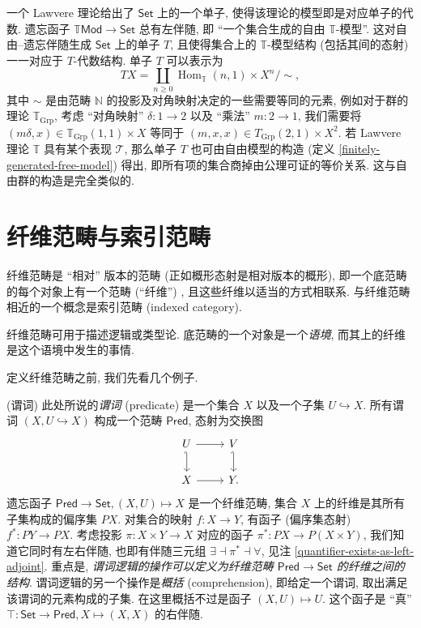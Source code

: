 一个 Lawvere 理论给出了 $\mathsf {Set}$ 上的一个单子, 使得该理论的模型即是对应单子的代数.
遗忘函子 $\mathbb T\mathsf {Mod}\to\mathsf {Set}$ 总有左伴随, 即 ``一个集合生成的自由 $\mathbb T$-模型''. 这对自由--遗忘伴随生成 $\mathsf {Set}$ 上的单子 $T$, 且使得集合上的 $\mathbb T$-模型结构 (包括其间的态射) 一一对应于 $T$-代数结构.
单子 $T$ 可以表示为
\[
	TX = \coprod_{n\geq 0} \operatorname{Hom}_{\mathbb T}(n,1)\times X^n\Bigg/ \sim,
\]
其中 $\sim$ 是由范畴 $\mathbb{N}$ 的投影及对角映射决定的一些需要等同的元素, 例如对于群的理论 $\mathbb T_{\text{Grp}}$,
考虑 ``对角映射'' $\delta\colon 1\to 2$ 以及 ``乘法'' $m\colon 2\to 1$, 我们需要将 $(m\delta,x)\in \mathbb T_{\text{Grp}}(1,1)\times X$ 等同于 $(m,x,x)\in T_{\text{Grp}}(2,1)\times X^2$.
若 Lawvere 理论 $\mathbb T$ 具有某个表现 $\mathcal T$,
那么单子 $T$ 也可由自由模型的构造 (定义 \ref{finitely-generated-free-model}) 得出, 即所有项的集合商掉由公理可证的等价关系. 这与自由群的构造是完全类似的.

\section{纤维范畴与索引范畴}

纤维范畴是 ``相对'' 版本的范畴 (正如概形态射是相对版本的概形), 即一个底范畴的每个对象上有一个范畴 (``纤维'') , 且这些纤维以适当的方式相联系.
与纤维范畴相近的一个概念是索引范畴 (indexed category).

纤维范畴可用于描述逻辑或类型论. 底范畴的一个对象是一个\emph{语境}, 而其上的纤维是这个语境中发生的事情.

定义纤维范畴之前, 我们先看几个例子.

\begin{example}
	{(谓词)}
	此处所说的\emph{谓词} (predicate) 是一个集合 $X$ 以及一个子集 $U\hookrightarrow X$. 所有谓词 $(X,U\hookrightarrow X)$ 构成一个范畴 $\mathsf{Pred}$, 态射为交换图
	\[\begin{tikzcd}[ampersand replacement=\&]
		U \& V \\
		X \& Y.
		\arrow[hook', from=1-1, to=2-1]
		\arrow[from=2-1, to=2-2]
		\arrow[from=1-1, to=1-2]
		\arrow[hook', from=1-2, to=2-2]
	\end{tikzcd}\]
	遗忘函子 $\mathsf {Pred}\to\mathsf {Set}, (X,U)\mapsto X$ 是一个纤维范畴, 集合 $X$ 上的纤维是其所有子集构成的偏序集 $PX$. 对集合的映射 $f\colon X\to Y$, 有函子 (偏序集态射) $f^*\colon PY\to PX$.
	考虑投影 $\pi\colon X\times Y\to X$ 对应的函子 $\pi^*\colon PX\to P(X\times Y)$, 我们知道它同时有左右伴随, 也即有伴随三元组 $\exists\dashv \pi^*\dashv \forall$, 见注 \ref{quantifier-exists-as-left-adjoint}.
	重点是, \emph{谓词逻辑的操作可以定义为纤维范畴 $\mathsf {Pred}\to\mathsf {Set}$ 的纤维之间的结构}.
	谓词逻辑的另一个操作是\emph{概括} (comprehension), 即给定一个谓词, 取出满足该谓词的元素构成的子集. 在这里概括不过是函子 $(X,U)\mapsto U$. 这个函子是 ``真'' $\top\colon \mathsf {Set}\to\mathsf {Pred},X\mapsto (X,X)$ 的右伴随.
\end{example}


